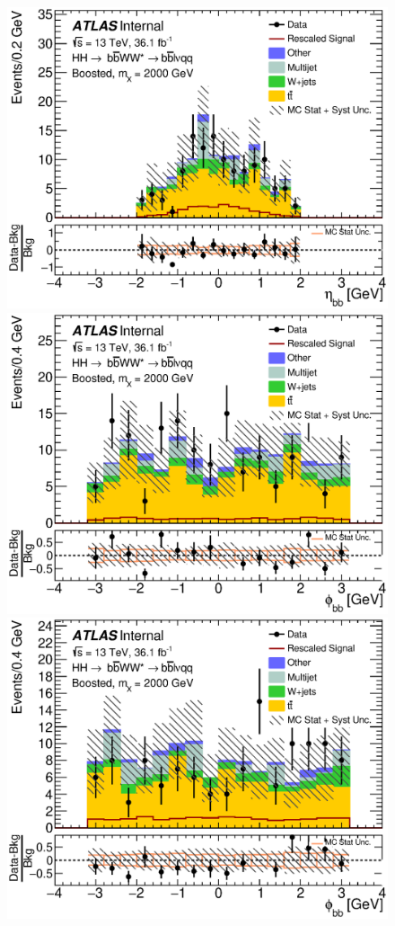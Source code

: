 \begin{figure}[h]
\begin{center}
\includegraphics[scale=0.33]{figures/kinplots/new/C_2tag_SR_muon_presel_met50_HbbEta}\\
\includegraphics[scale=0.33]{figures/kinplots/new/C_2tag_SR_elec_presel_met50_HbbPhi}
\includegraphics[scale=0.33]{figures/kinplots/new/C_2tag_SR_muon_presel_met50_HbbPhi}

\end{center}
\end{figure}
